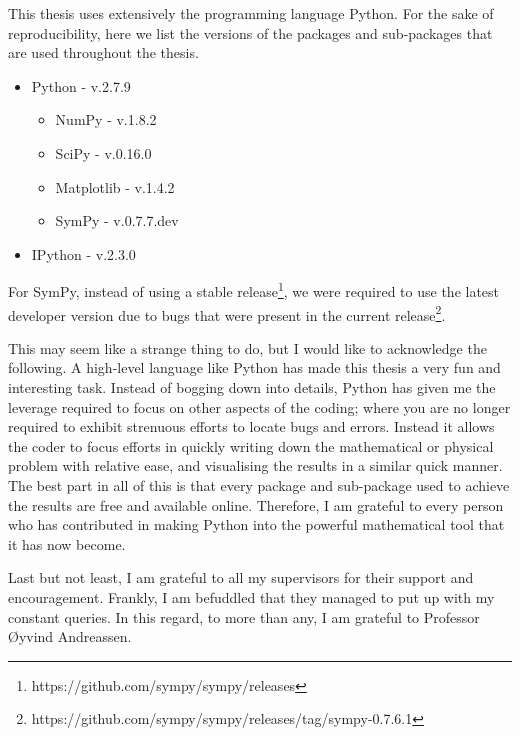 \documentclass[main.tex]{subfiles}
\begin{document}
This thesis uses extensively the programming language Python. 
For the sake of reproducibility, here we list the versions of the packages and sub-packages 
that are used throughout the thesis.
\begin{itemize}
\item Python - v.2.7.9 
\begin{itemize}
\item NumPy - v.1.8.2
\item SciPy - v.0.16.0
\item Matplotlib - v.1.4.2
\item SymPy - v.0.7.7.dev
\end{itemize}
\item IPython - v.2.3.0 
\end{itemize}
For SymPy, instead of using a stable release\footnote{https://github.com/sympy/sympy/releases}, 
we were required to use the latest developer version due to bugs that were present in the current
release\footnote{https://github.com/sympy/sympy/releases/tag/sympy-0.7.6.1}.
\\
\par
This may seem like a strange thing to do, but I would like to acknowledge the following.
A high-level language like Python has made this thesis a very fun and interesting task.
Instead of bogging down into details, Python has given me the leverage required to
focus on other aspects of the coding; where you are no longer required to exhibit strenuous efforts
to locate bugs and errors. Instead it allows the coder to focus efforts in quickly writing
down the mathematical or physical problem with relative ease, and visualising the results in
a similar quick manner. The best part
in all of this is that every package and sub-package used to achieve the results are free and
available online. Therefore, I am grateful to every person who has contributed in making Python into
the powerful mathematical tool that it has now become.
\\
\par
Last but not least, I am grateful to all my supervisors for their support and encouragement.
Frankly, I am befuddled that they managed to put up with my constant queries. In this regard,
to more than any, I am grateful to Professor \O yvind Andreassen.
\end{document}
